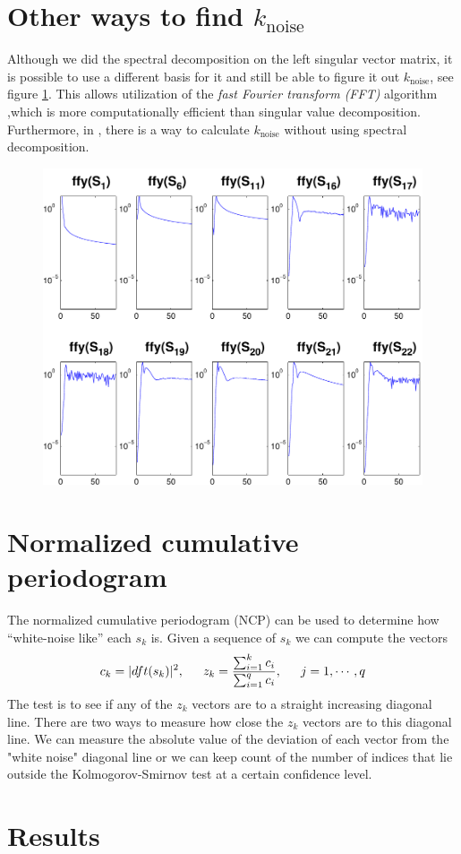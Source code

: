 \documentclass[11pt]{amsart}
\begin{document}
\section{Other ways to find $k_{\text{noise}}$}
Although we did the spectral decomposition on the left singular vector matrix,
it is possible to use a different basis for it and still be able to figure it
out $k_{\text{noise}}$, see figure \ref{fig:fft}. This allows utilization of
the \emph{fast Fourier transform (FFT)} algorithm ,which is more computationally
efficient than singular value decomposition. Furthermore, in 
\cite{bidiagonalization}, there is a way to calculate $k_{\text{noise}}$ without
using spectral decomposition.
\begin{figure}[htb] 
  \begin{center}
    \includegraphics[width=0.55\linewidth]{figures/run1/fft_sk}
  \end{center}
\caption{}
\label{fig:fft}
\end{figure}

\section{Normalized cumulative periodogram}
The normalized cumulative periodogram (NCP) can be used to determine how 
``white-noise like'' each $s_k$ is. Given a sequence of $s_k$ we can compute the
vectors
$$c_k = |dft(s_k)|^2, \indent z_k = \frac{\sum_{i=1}^k c_i}{ \sum_{i=1}^q c_i}, \indent j=1,\cdots, q$$ 
The test is to see if any of the $z_k$ vectors are to a straight increasing diagonal line. There are two 
ways to measure how close the $z_k$ vectors are to this diagonal line. We can measure the 
absolute value of the deviation of each vector from the "white noise" diagonal line or we can keep
count of the number of indices that lie outside the Kolmogorov-Smirnov test at a certain confidence 
level. 

\section{Results}
\end{document}
